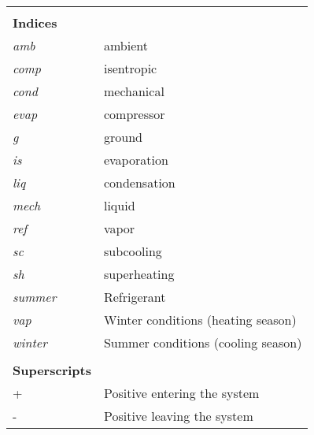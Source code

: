 \begin{table}[thp!]
\begin{tabular}{ll}
		&  \\
		\textbf{Indices} &  \\
		\textit{amb} & ambient \\
		\textit{comp} & isentropic \\
		\textit{cond} & mechanical \\
		\textit{evap} & compressor \\
		\textit{g} & ground\\
		\textit{is} & evaporation \\
		\textit{liq} & condensation \\
		\textit{mech} & liquid \\
		\textit{ref} & vapor \\
		\textit{sc} & subcooling \\
		\textit{sh} & superheating \\
		\textit{summer} & Refrigerant \\
		\textit{vap} & Winter conditions (heating season) \\
		\textit{winter} & Summer conditions (cooling season) \\
		&  \\
		\textbf{Superscripts} &  \\
		+ & Positive entering the system \\
		- & Positive leaving the system
	\end{tabular}
\end{table}